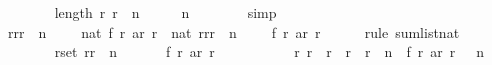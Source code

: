 \begin{isabellebody}
\ \ \ \ \ \ \isamarkupfalse%
\ {\isacharbackquoteopen}length\ {\isacharparenleft}{\isacharbrackleft}r{}{\isachardot}{\isachardot}{\isacharless}\ {\isacharparenleft}r{}\ {\isacharplus}\ n\ {\isacharminus}\ {}{\isacharparenright}\ {\isacharplus}\ {}{\isacharbrackright}{\isacharparenright}\ {\isacharequal}\ n{\isacharbackquoteclose}\isanewline
\ \ \ \ \ \ \isamarkupfalse%
\ simp\isanewline
\isanewline
\ \ \ \ \isamarkupfalse%
\isanewline
\isanewline
\ \ \ \ \isamarkupfalse%
\ {\isachardoublequoteopen}{\isacharparenleft}{\isasymSum}r{\isacharprime}{\isasymleftarrow}{\isacharbrackleft}r{}{\isachardot}{\isachardot}{\isacharless}{\isacharparenleft}r{}\ {\isacharplus}\ n\ {\isacharminus}\ {}{\isacharparenright}\ {\isacharplus}\ {}{\isacharbrackright}{\isachardot}\ nat\ {\isacharparenleft}f\ r{\isacharprime}\ {\isacharparenleft}ar\ r{\isacharprime}{\isacharparenright}{\isacharparenright}{\isacharparenright}\ {\isacharequal}\ nat\ {\isacharparenleft}{\isacharparenleft}{\isasymSum}r{\isacharprime}{\isasymleftarrow}{\isacharbrackleft}r{}{\isachardot}{\isachardot}{\isacharless}{\isacharparenleft}r{}\ {\isacharplus}\ n\ {\isacharminus}\ {}{\isacharparenright}\ {\isacharplus}\ {}{\isacharbrackright}{\isachardot}\ f\ r{\isacharprime}\ {\isacharparenleft}ar\ r{\isacharprime}{\isacharparenright}{\isacharparenright}{\isacharparenright}{\isachardoublequoteclose}\isanewline
\ \ \ \ \isamarkupfalse%
\ {\isacharparenleft}rule\ sum{\isacharunderscore}list{\isacharunderscore}nat{\isacharparenright}\isanewline
\ \ \ \ \ \ \isamarkupfalse%
\ {\isachardoublequoteopen}{\isasymforall}r{\isacharprime}{\isasymin}set\ {\isacharbrackleft}r{}{\isachardot}{\isachardot}{\isacharless}{\isacharparenleft}r{}\ {\isacharplus}\ n\ {\isacharminus}\ {}{\isacharparenright}\ {\isacharplus}\ {}{\isacharbrackright}{\isachardot}\ {}\ {\isasymle}\ f\ r{\isacharprime}\ {\isacharparenleft}ar\ r{\isacharprime}{\isacharparenright}{\isachardoublequoteclose}\isanewline
\ \ \ \ \ \ \ \ \isamarkupfalse%
\ {\isacharbackquoteopen}{\isasymforall}\ r{\isachardot}\ r{}\ {\isasymle}\ r\ {\isasymand}\ r\ {\isacharless}\ r{}\ {\isacharplus}\ n\ {\isasymlongrightarrow}\ f\ r\ {\isacharparenleft}ar\ r{\isacharparenright}\ {\isachargreater}\ {}{}{}{}{\isacharbackquoteclose}\ {\isacharbackquoteopen}n\ {\isasymge}\ {}{}{}{}{\isacharbackquoteclose}\isanewline

\end{isabellebody}
